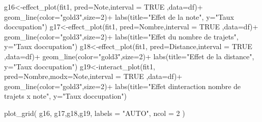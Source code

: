 \documentclass[
]{book}
\newenvironment{Shaded}{\begin{snugshade}}{\end{snugshade}}
\newcommand{\AttributeTok}[1]{\textcolor[rgb]{0.77,0.63,0.00}{#1}}
\newcommand{\ConstantTok}[1]{\textcolor[rgb]{0.00,0.00,0.00}{#1}}
\newcommand{\DecValTok}[1]{\textcolor[rgb]{0.00,0.00,0.81}{#1}}
\newcommand{\FunctionTok}[1]{\textcolor[rgb]{0.00,0.00,0.00}{#1}}
\newcommand{\NormalTok}[1]{#1}
\newcommand{\OtherTok}[1]{\textcolor[rgb]{0.56,0.35,0.01}{#1}}
\newcommand{\SpecialCharTok}[1]{\textcolor[rgb]{0.00,0.00,0.00}{#1}}
\newcommand{\StringTok}[1]{\textcolor[rgb]{0.31,0.60,0.02}{#1}}
\begin{document}
\begin{Shaded}
\begin{Highlighting}[]
\NormalTok{g16}\OtherTok{\textless{}{-}}\FunctionTok{effect\_plot}\NormalTok{(fit1, }\AttributeTok{pred=}\NormalTok{Note,}\AttributeTok{interval =} \ConstantTok{TRUE}\NormalTok{ ,}\AttributeTok{data=}\NormalTok{df)}\SpecialCharTok{+}
  \FunctionTok{geom\_line}\NormalTok{(}\AttributeTok{color=}\StringTok{"gold3"}\NormalTok{,}\AttributeTok{size=}\DecValTok{2}\NormalTok{)}\SpecialCharTok{+}
  \FunctionTok{labs}\NormalTok{(}\AttributeTok{title=}\StringTok{"Effet de la note"}\NormalTok{,}
       \AttributeTok{y=}\StringTok{"Taux d\textquotesingle{}occupation"}\NormalTok{)}
\NormalTok{g17}\OtherTok{\textless{}{-}}\FunctionTok{effect\_plot}\NormalTok{(fit1, }\AttributeTok{pred=}\NormalTok{Nombre,}\AttributeTok{interval =} \ConstantTok{TRUE}\NormalTok{  ,}\AttributeTok{data=}\NormalTok{df)}\SpecialCharTok{+}
  \FunctionTok{geom\_line}\NormalTok{(}\AttributeTok{color=}\StringTok{"gold3"}\NormalTok{,}\AttributeTok{size=}\DecValTok{2}\NormalTok{)}\SpecialCharTok{+}
  \FunctionTok{labs}\NormalTok{(}\AttributeTok{title=}\StringTok{"Effet du nombre de trajets"}\NormalTok{,}
       \AttributeTok{y=}\StringTok{"Taux d\textquotesingle{}occupation"}\NormalTok{)}
\NormalTok{g18}\OtherTok{\textless{}{-}}\FunctionTok{effect\_plot}\NormalTok{(fit1, }\AttributeTok{pred=}\NormalTok{Distance,}\AttributeTok{interval =} \ConstantTok{TRUE}\NormalTok{  ,}\AttributeTok{data=}\NormalTok{df)}\SpecialCharTok{+}
  \FunctionTok{geom\_line}\NormalTok{(}\AttributeTok{color=}\StringTok{"gold3"}\NormalTok{,}\AttributeTok{size=}\DecValTok{2}\NormalTok{)}\SpecialCharTok{+}
  \FunctionTok{labs}\NormalTok{(}\AttributeTok{title=}\StringTok{"Effet de la distance"}\NormalTok{,}
       \AttributeTok{y=}\StringTok{"Taux d\textquotesingle{}occupation"}\NormalTok{)}
\NormalTok{g19}\OtherTok{\textless{}{-}}\FunctionTok{interact\_plot}\NormalTok{(fit1, }\AttributeTok{pred=}\NormalTok{Nombre,}\AttributeTok{modx=}\NormalTok{Note,}\AttributeTok{interval =} \ConstantTok{TRUE}\NormalTok{  ,}\AttributeTok{data=}\NormalTok{df)}\SpecialCharTok{+}
  \FunctionTok{geom\_line}\NormalTok{(}\AttributeTok{color=}\StringTok{"gold3"}\NormalTok{,}\AttributeTok{size=}\DecValTok{2}\NormalTok{)}\SpecialCharTok{+}
  \FunctionTok{labs}\NormalTok{(}\AttributeTok{title=}\StringTok{"Effet d\textquotesingle{}interaction nombre de trajets x note"}\NormalTok{,}
       \AttributeTok{y=}\StringTok{"Taux d\textquotesingle{}occupation"}\NormalTok{)}

\FunctionTok{plot\_grid}\NormalTok{(}
\NormalTok{  g16, g17,g18,g19,}
  \AttributeTok{labels =} \StringTok{"AUTO"}\NormalTok{, }\AttributeTok{ncol =} \DecValTok{2}
\NormalTok{)}
\end{Highlighting}
\end{Shaded}
\end{document}
